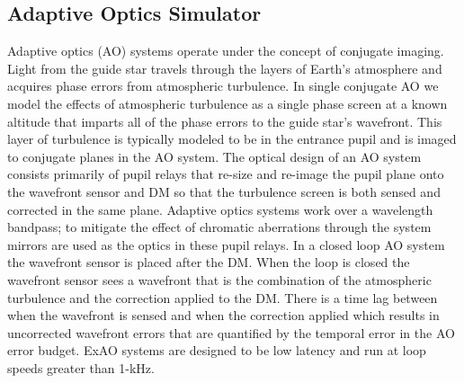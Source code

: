 \documentclass[12pt]{spieman}  %
\begin{document}
\begin{spacing}{2}
\subsection{Adaptive Optics Simulator}

Adaptive optics (AO) systems operate under the concept of conjugate imaging. Light from the guide star travels through the layers of Earth's atmosphere and acquires phase errors from atmospheric turbulence. In single conjugate AO we model the effects of atmospheric turbulence as a single phase screen at a known altitude that imparts all of the phase errors to the guide star's wavefront. This layer of turbulence is typically modeled to be in the entrance pupil and is imaged to conjugate planes in the AO system. The optical design of an AO system consists primarily of pupil relays that re-size and re-image the pupil plane onto the wavefront sensor and DM so that the turbulence screen is both sensed and corrected in the same plane. Adaptive optics systems work over a wavelength bandpass; to mitigate the effect of chromatic aberrations through the system mirrors are used as the optics in these pupil relays. In a closed loop AO system the wavefront sensor is placed after the DM. When the loop is closed the wavefront sensor sees a wavefront that is the combination of the atmospheric turbulence and the correction applied to the DM. There is a time lag between when the wavefront is sensed and when the correction applied which results in uncorrected wavefront errors that are quantified by the temporal error in the AO error budget. ExAO systems are designed to be low latency and run at loop speeds greater than 1-kHz.


\end{spacing}
\end{document}
